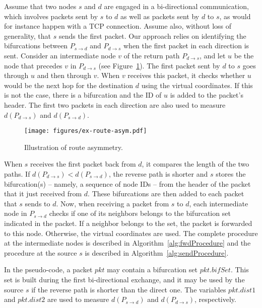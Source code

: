 \documentclass[conference]{IEEEtran}
\begin{document}
Assume that two nodes $s$ and $d$ are engaged in a bi-directional communication, which involves packets sent by $s$ to $d$ as well as packets sent by $d$ to $s$, as would for instance happen with a TCP connection.
Assume also, without loss of generality, that $s$ sends the first packet.
Our approach relies on identifying the bifurcations between $P_{s \rightarrow d}$ and $P_{d \rightarrow s}$ when the first packet in each direction is sent.
Consider an intermediate node $v$ of the return path $P_{d \rightarrow s}$, and let $u$ be the node that precedes $v$ in $P_{d \rightarrow s}$ (see Figure~\ref{fig:ex-asym}). The first packet sent by $d$ to $s$ goes through $u$ and then through $v$. When $v$ receives this packet, it checks whether $u$ would be the next hop for the destination $d$ using the virtual coordinates. If this is not the case, there is a bifurcation and the ID of $u$ is added to the packet's header. The first two packets in each direction are also used to measure $d(P_{d \rightarrow s})$ and $d(P_{s \rightarrow d})$.

\begin{figure}
\centering
\texttt{[image: figures/ex-route-asym.pdf]}\caption{Illustration of route asymmetry.}
\label{fig:ex-asym}
\end{figure}

When $s$ receives the first packet back from $d$, it compares the length of the two paths. If $d(P_{d \rightarrow s}) < d(P_{s \rightarrow d})$, the reverse path is shorter and $s$ stores the bifurcation(s) -- namely, a sequence of node IDs -- from the header of the packet that it just received from $d$. These bifurcations are then added to each packet that $s$ sends to $d$. Now, when receiving a packet from $s$ to $d$, each intermediate node in $P_{s \rightarrow d}$ checks if one of its neighbors belongs to the bifurcation set indicated in the packet. If a neighbor belongs to the set, the packet is forwarded to this node. Otherwise, the virtual coordinates are used. The complete procedure at the intermediate nodes is described in Algorithm~\ref{alg:fwdProcedure} and the procedure at the source $s$ is described in Algorithm~\ref{alg:sendProcedure}.

In the pseudo-code, a packet $pkt$ may contain a bifurcation set $pkt.bifSet$. This set is built during the first bi-directional exchange, and it may be used by the source $s$ if the reverse path is shorter than the direct one. The variables $pkt.dist1$ and $pkt.dist2$ are used to measure $d(P_{s \rightarrow d})$ and $d(P_{d \rightarrow s})$, respectively. 
\end{document}
